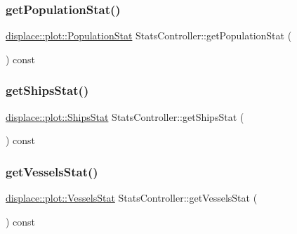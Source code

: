 \mbox{\label{class_stats_controller_a0cbedafee3a42961ee7e8e2920063347}} 
\subsubsection{\texorpdfstring{getPopulationStat()}{getPopulationStat()}}
{\footnotesize\ttfamily \mbox{\hyperlink{namespacedisplace_1_1plot_a523612c6239ff69acc3e5b7c5b40b618}{displace\+::plot\+::\+Population\+Stat}} Stats\+Controller\+::get\+Population\+Stat (\begin{DoxyParamCaption}{ }\end{DoxyParamCaption}) const\hspace{0.3cm}{\ttfamily [inline]}}

\mbox{\label{class_stats_controller_a6ea8bb040cd7f68f76b028827afddbed}} 
\subsubsection{\texorpdfstring{getShipsStat()}{getShipsStat()}}
{\footnotesize\ttfamily \mbox{\hyperlink{namespacedisplace_1_1plot_a8c50b4d54cafba744b1b5b51b53407e0}{displace\+::plot\+::\+Ships\+Stat}} Stats\+Controller\+::get\+Ships\+Stat (\begin{DoxyParamCaption}{ }\end{DoxyParamCaption}) const\hspace{0.3cm}{\ttfamily [inline]}}

\mbox{\label{class_stats_controller_ac6ce071b7ab4012c5957a7ae2aec9f78}} 
\subsubsection{\texorpdfstring{getVesselsStat()}{getVesselsStat()}}
{\footnotesize\ttfamily \mbox{\hyperlink{namespacedisplace_1_1plot_aa453098d286017edd5b0ff3f15ba1013}{displace\+::plot\+::\+Vessels\+Stat}} Stats\+Controller\+::get\+Vessels\+Stat (\begin{DoxyParamCaption}{ }\end{DoxyParamCaption}) const\hspace{0.3cm}{\ttfamily [inline]}}

